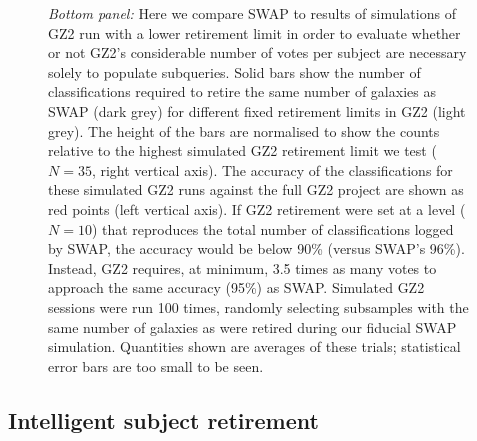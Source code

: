 \documentclass[twocolumn,  trackchanges, ]{aastex6}%
\begin{document}
\begin{figure}[t!]
{{\textit{Bottom panel:} Here we compare SWAP to results of simulations of GZ2 run with a lower retirement limit in order to evaluate whether or not GZ2's considerable number of votes per subject are necessary solely to populate subqueries. Solid bars show the number of classifications required to retire the same number of galaxies as SWAP (dark grey) for different fixed retirement limits in GZ2 (light grey). The height of the bars are normalised to show the counts relative to the highest simulated GZ2 retirement limit we test ($N=35$, right vertical axis).  The accuracy of the classifications for these simulated GZ2 runs against the full GZ2 project are shown as red points (left vertical axis). If GZ2 retirement were set at a level ($N=10$) that reproduces the total number of classifications logged by SWAP, the accuracy would be below 90\% (versus SWAP's 96\%).  Instead, GZ2 requires, at minimum, 3.5 times as many votes to approach the same accuracy (95\%) as SWAP. Simulated GZ2 sessions were run 100 times, randomly selecting subsamples with the same number of galaxies as were retired during our fiducial SWAP simulation. Quantities shown are averages of these trials; statistical error bars are too small to be seen.}}
\label{fig: swap is faster}
\end{figure}

\subsection{Intelligent subject retirement}\label{sec: swap is faster}

\end{document}
